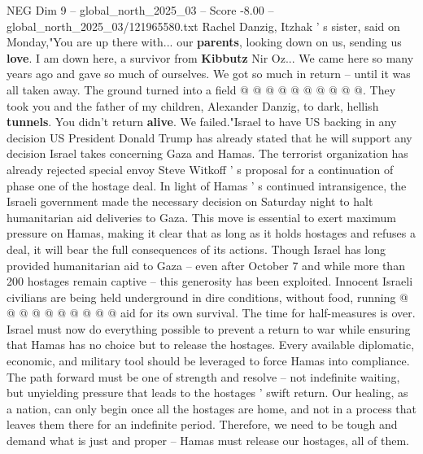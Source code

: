 \begin{textsample}{NEG Dim 9 – global\_north\_2025\_03 – Score -8.00 – global\_north\_2025\_03/121965580.txt}
Rachel Danzig, Itzhak ' s sister, said on Monday,"You are up there with... our \textbf{parents}, looking down on us, sending us \textbf{love}.
I am down here, a survivor from \textbf{Kibbutz} Nir Oz...
We came here so many years ago and gave so much of ourselves.
We got so much in return -- until it was all taken away.
The ground turned into a field @ @ @ @ @ @ @ @ @ @.
They took you and the father of my children, Alexander Danzig, to dark, hellish \textbf{tunnels}.
You didn't return \textbf{alive}.
We failed."Israel to have US backing in any decision US President Donald Trump has already stated that he will support any decision Israel takes concerning Gaza and Hamas.
The terrorist organization has already rejected special envoy Steve Witkoff ' s proposal for a continuation of phase one of the hostage deal.
In light of Hamas ' s continued intransigence, the Israeli government made the necessary decision on Saturday night to halt humanitarian aid deliveries to Gaza.
This move is essential to exert maximum pressure on Hamas, making it clear that as long as it holds hostages and refuses a deal, it will bear the full consequences of its actions.
Though Israel has long provided humanitarian aid to Gaza -- even after October 7 and while more than 200 hostages remain captive -- this generosity has been exploited.
Innocent Israeli civilians are being held underground in dire conditions, without food, running @ @ @ @ @ @ @ @ @ @ aid for its own survival.
The time for half-measures is over.
Israel must now do everything possible to prevent a return to war while ensuring that Hamas has no choice but to release the hostages.
Every available diplomatic, economic, and military tool should be leveraged to force Hamas into compliance.
The path forward must be one of strength and resolve -- not indefinite waiting, but unyielding pressure that leads to the hostages ' swift return.
Our healing, as a nation, can only begin once all the hostages are home, and not in a process that leaves them there for an indefinite period.
Therefore, we need to be tough and demand what is just and proper -- Hamas must release our hostages, all of them.

\end{textsample}
